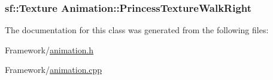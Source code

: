 \subsubsection[{\texorpdfstring{Princess\+Texture\+Walk\+Right}{PrincessTextureWalkRight}}]{\setlength{\rightskip}{0pt plus 5cm}sf\+::\+Texture Animation\+::\+Princess\+Texture\+Walk\+Right\hspace{0.3cm}{\ttfamily [protected]}}\hypertarget{classAnimation_ab77fb25df92b7ad25ffb925763cb650d}{}\label{classAnimation_ab77fb25df92b7ad25ffb925763cb650d}


The documentation for this class was generated from the following files\+:\begin{DoxyCompactItemize}
\item 
Framework/\hyperlink{animation_8h}{animation.\+h}\item 
Framework/\hyperlink{animation_8cpp}{animation.\+cpp}\end{DoxyCompactItemize}
